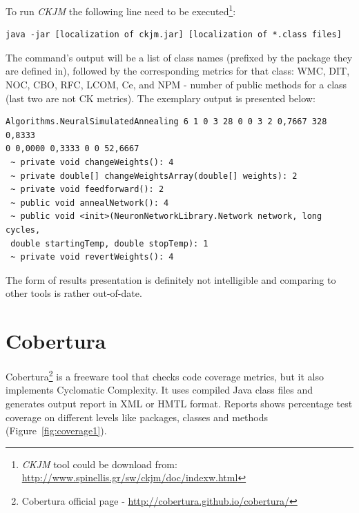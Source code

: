 To run \textit{CKJM} the following line need to be executed\footnote{\textit{CKJM} tool could be download from: \url{http://www.spinellis.gr/sw/ckjm/doc/indexw.html}}:

\begin{verbatim} 
java -jar [localization of ckjm.jar] [localization of *.class files] 
\end{verbatim} 

The command's output will be a list of class names (prefixed by the package they are defined in), followed by the corresponding metrics for that class: \ac{WMC}, \ac{DIT}, \ac{NOC}, \ac{CBO}, \ac{RFC}, \ac{LCOM}, \ac{Ce}, and NPM - number of public methods for a class (last two are not \ac{CK metrics}). The exemplary output is presented below:

\begin{verbatim} 
Algorithms.NeuralSimulatedAnnealing 6 1 0 3 28 0 0 3 2 0,7667 328 0,8333 
0 0,0000 0,3333 0 0 52,6667
 ~ private void changeWeights(): 4
 ~ private double[] changeWeightsArray(double[] weights): 2
 ~ private void feedforward(): 2
 ~ public void annealNetwork(): 4
 ~ public void <init>(NeuronNetworkLibrary.Network network, long cycles, 
 double startingTemp, double stopTemp): 1
 ~ private void revertWeights(): 4
\end{verbatim} 

The form of results presentation is definitely not intelligible and comparing to other tools is rather out-of-date.  


\section{Cobertura}
Cobertura\footnote{Cobertura official page - \url{http://cobertura.github.io/cobertura/}} is a freeware tool that checks code coverage metrics, but it also implements Cyclomatic Complexity.  It uses compiled Java class files and generates output report in XML or HMTL format. Reports shows percentage test coverage on different levels like packages, classes and methods (Figure~\ref{fig:coverage1}). 

